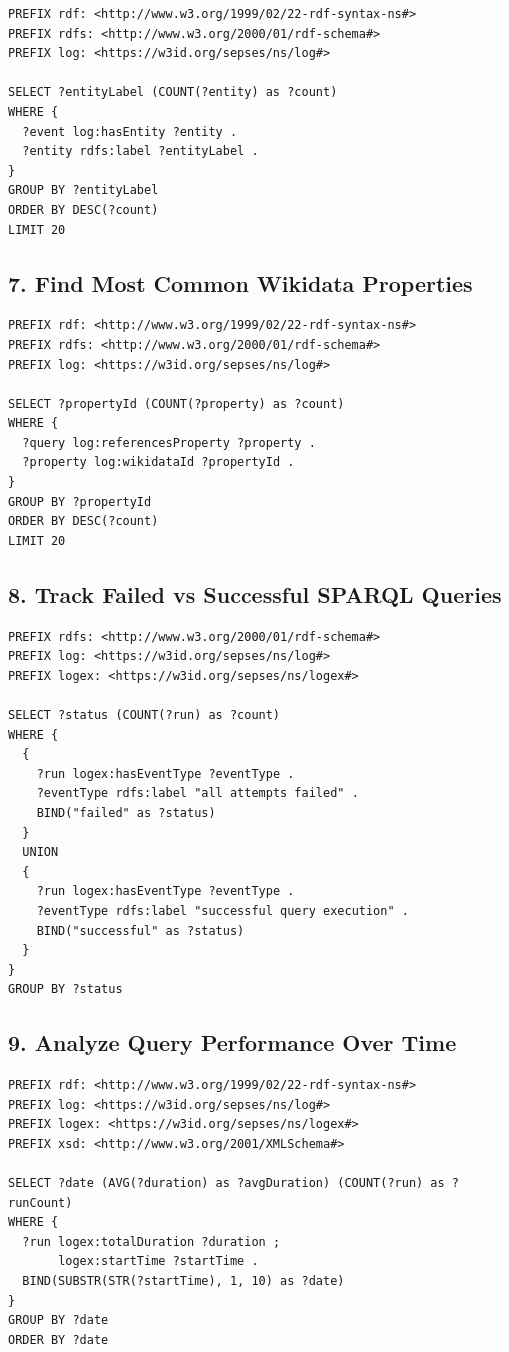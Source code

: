\begin{lstlisting}[language=sparql]
PREFIX rdf: <http://www.w3.org/1999/02/22-rdf-syntax-ns#>
PREFIX rdfs: <http://www.w3.org/2000/01/rdf-schema#>
PREFIX log: <https://w3id.org/sepses/ns/log#>

SELECT ?entityLabel (COUNT(?entity) as ?count)
WHERE {
  ?event log:hasEntity ?entity .
  ?entity rdfs:label ?entityLabel .
}
GROUP BY ?entityLabel
ORDER BY DESC(?count)
LIMIT 20
\end{lstlisting}

\subsection*{7. Find Most Common Wikidata Properties}

\begin{lstlisting}[language=sparql]
PREFIX rdf: <http://www.w3.org/1999/02/22-rdf-syntax-ns#>
PREFIX rdfs: <http://www.w3.org/2000/01/rdf-schema#>
PREFIX log: <https://w3id.org/sepses/ns/log#>

SELECT ?propertyId (COUNT(?property) as ?count)
WHERE {
  ?query log:referencesProperty ?property .
  ?property log:wikidataId ?propertyId .
}
GROUP BY ?propertyId
ORDER BY DESC(?count)
LIMIT 20
\end{lstlisting}

\subsection*{8. Track Failed vs Successful SPARQL Queries}

\begin{lstlisting}[language=sparql]
PREFIX rdfs: <http://www.w3.org/2000/01/rdf-schema#>
PREFIX log: <https://w3id.org/sepses/ns/log#>
PREFIX logex: <https://w3id.org/sepses/ns/logex#>

SELECT ?status (COUNT(?run) as ?count)
WHERE {
  {
    ?run logex:hasEventType ?eventType .
    ?eventType rdfs:label "all attempts failed" .
    BIND("failed" as ?status)
  }
  UNION
  {
    ?run logex:hasEventType ?eventType .
    ?eventType rdfs:label "successful query execution" .
    BIND("successful" as ?status)
  }
}
GROUP BY ?status
\end{lstlisting}

\subsection*{9. Analyze Query Performance Over Time}

\begin{lstlisting}[language=sparql]
PREFIX rdf: <http://www.w3.org/1999/02/22-rdf-syntax-ns#>
PREFIX log: <https://w3id.org/sepses/ns/log#>
PREFIX logex: <https://w3id.org/sepses/ns/logex#>
PREFIX xsd: <http://www.w3.org/2001/XMLSchema#>

SELECT ?date (AVG(?duration) as ?avgDuration) (COUNT(?run) as ?runCount)
WHERE {
  ?run logex:totalDuration ?duration ;
       logex:startTime ?startTime .
  BIND(SUBSTR(STR(?startTime), 1, 10) as ?date)
}
GROUP BY ?date
ORDER BY ?date
\end{lstlisting}

